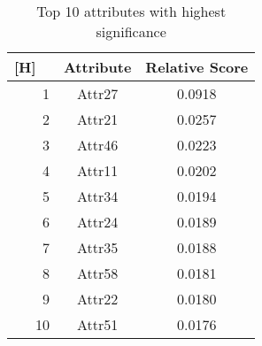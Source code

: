 \begin{table}[H]
\centering
\begin{tabular}{r|cc}[H]
     ~ & \textbf{Attribute} &\textbf{Relative Score}  \\
     \hline
     1 & Attr27 & 0.0918 \\
     2 & Attr21 & 0.0257\\
     3 & Attr46 & 0.0223\\
     4 & Attr11 & 0.0202\\
     5 & Attr34 & 0.0194\\
     6 & Attr24 & 0.0189\\
     7 & Attr35 & 0.0188\\
     8 & Attr58 & 0.0181\\
     9 & Attr22 & 0.0180\\
     10 & Attr51 & 0.0176\\
\end{tabular}
\caption{\label{tab::feature_selection} Top 10 attributes with highest significance}
\end{table}

